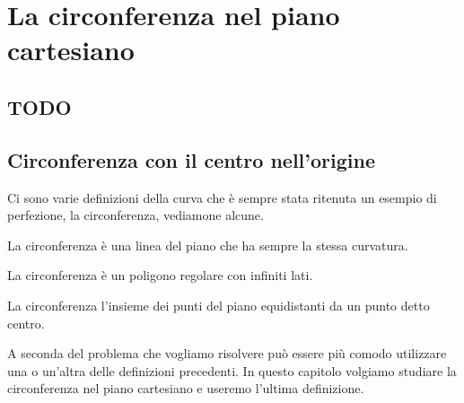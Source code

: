 


\chapter{La circonferenza nel piano cartesiano}

\section{TODO}

\section{Circonferenza con il centro nell'origine}
\label{sec:circ_circcentroorigine}

% 

Ci sono varie definizioni della curva che è sempre stata ritenuta un esempio di 
perfezione, la circonferenza, vediamone alcune.

\begin{definizione}%
 La circonferenza è una linea del piano che ha sempre la stessa curvatura.
\end{definizione}

\begin{definizione}%
 La circonferenza è un poligono regolare con infiniti lati.
\end{definizione}

\begin{definizione}%
 La circonferenza l'insieme dei punti del piano equidistanti da un punto detto 
centro.
\end{definizione}

A seconda del problema che vogliamo risolvere può essere più comodo utilizzare 
una o un'altra delle definizioni precedenti. In questo capitolo volgiamo 
studiare la circonferenza nel piano cartesiano e useremo l'ultima definizione.


